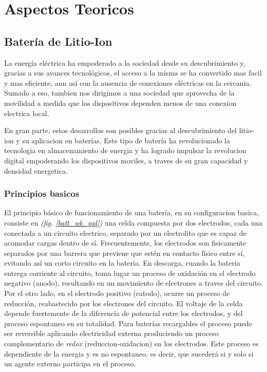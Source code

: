 \documentclass[10pt,a4paper]{article}
\begin{document}
\clearpage

\section{Aspectos Teoricos}\label{teoria}

\subsection{Batería de Litio-Ion}

La energía eléctrica ha empoderado a la sociedad desde su descubrimiento y,
gracias a sus avances tecnológicos, el acceso a la misma se ha convertido mas
facil y mas eficiente, aun así con la ausencia de conexiones eléctricas en la
cercania. Sumado a eso, tambien nos dirigimos a una sociedad que aprovecha de la
movilidad a medida que los dispositivos dependen menos de una conexion electrica
local.

\noindent En gran parte, estos desarrollos son posibles gracias al
descubrimiento del litio-ion y su aplicacion en baterías. Este tipo de batería
ha revolucionado la tecnologia en almacenamiento de energia y ha logrado
impulsar la revolucion digital empoderando los dispositivos moviles, a traves de
su gran capacidad y densidad energetica.

\subsubsection{Principios basicos}

El principio básico de funcionamiento de una batería, en su configuracion
basica, consiste en \emph{(fig. \ref{batt_wk_ppl})} una celda compuesta por dos
electrodos, cada una conectada a un circuito electrico, separado por un
electrolito que es capaz de acomodar cargas dentro de sí. Frecuentemente, los
electrodos son fisicamente separados por una barrera que previene que estén en
contacto físico entre sí, evitando así un corto circuito en la bateria. En
descarga, cuando la bateria entrega corriente al circuito, toma lugar un proceso
de oxidación en el electrodo negativo (anodo), resultando en un movimiento de
electrones a traves del circuito. Por el otro lado, en el electrodo positivo
(catodo), ocurre un proceso de reducción, reabastecido por los electrones del
circuito. El voltaje de la celda depende fuertemente de la diferencia de
potencial entre los electrodos, y del proceso espontaneo en su totalidad.  Para
baterías recargables el proceso puede ser reversible aplicando electricidad
externa produciendo un proceso complementario de \emph{redox}
(reduccion-oxidacion) en los electrodos. Este proceso es dependiente de la
energia y es no espontaneo, es decir, que sucederá si y solo si un agente
externo participa en el proceso.
\end{document}
